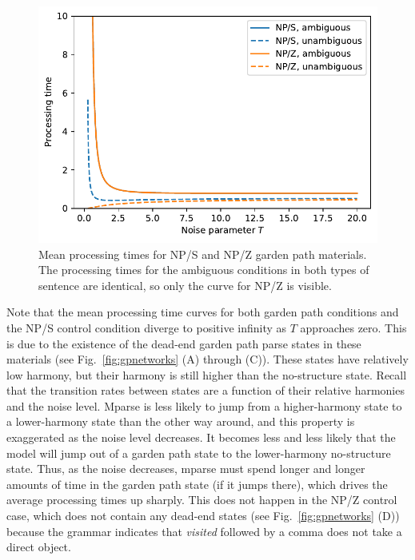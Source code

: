 \documentclass[a4paper, 12pt]{article}
\begin{document}
\begin{figure}[htbp]
\centering

\includegraphics[width= \linewidth]{figures/mparse_intro_gpnoisefig_1.pdf}

\caption{Mean processing times for NP/S and NP/Z garden path materials. The
    processing times for the ambiguous conditions in both types of sentence are
    identical, so only the curve for NP/Z is visible.}\label{fig:gp-times}
\end{figure}

Note that the mean processing time curves for both garden path conditions and
the NP/S control condition diverge to positive infinity as $T$ approaches zero.
This is due to the existence of the dead-end garden path parse states in these
materials (see Fig.~\ref{fig:gpnetworks} (A) through (C)). These states have
relatively low harmony, but their harmony is still higher than the no-structure
state. Recall that the transition rates between states are a function of their
relative harmonies and the noise level. Mparse is less likely to jump from a
higher-harmony state to a lower-harmony state than the other way around, and
this property is exaggerated as the noise level decreases. It becomes less and
less likely that the model will jump out of a garden path state to the
lower-harmony no-structure state. Thus, as the noise decreases, mparse must
spend longer and longer amounts of time in the garden path state (if it jumps
there), which drives the average processing times up sharply. This does not
happen in the NP/Z control case, which does not contain any dead-end states
(see Fig.~\ref{fig:gpnetworks} (D)) because the grammar indicates that
\emph{visited} followed by a comma does not take a direct object.
\end{document}
